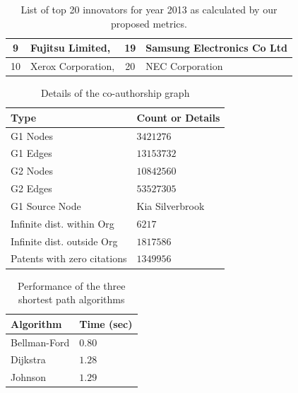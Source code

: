 \begin{table}[t]
\begin{tabular}{clcl}
\multicolumn{1}{|c|}{9}             & \multicolumn{1}{l|}{Fujitsu Limited,}                            & \multicolumn{1}{c|}{19}            & \multicolumn{1}{l|}{Samsung Electronics Co Ltd}                \\ \hline
\multicolumn{1}{|c|}{10}            & \multicolumn{1}{l|}{Xerox Corporation,}                          & \multicolumn{1}{c|}{20}            & \multicolumn{1}{l|}{NEC Corporation}                           \\ \hline                                                               
\end{tabular}
\caption{List of top 20 innovators for year 2013 as calculated by our proposed metrics.}
\label{lst:top20}
\end{table}


\begin{table}[t]
\centering

		\begin{tabular}{| l | l |}
		\hline
		
		{Type} & {Count or Details} \\
		\hline
		\hline
		G1 Nodes & $3421276$ \\
		G1 Edges & $13153732$ \\
		G2 Nodes & $10842560$ \\
		G2 Edges & $53527305$ \\
		G1 Source Node & Kia Silverbrook \\
		Infinite dist. within Org & $6217$\\
		Infinite dist. outside Org& $1817586$ \\
		Patents with zero citations & $1349956$ \\
		\hline
	\end{tabular}		
	\caption { Details of the co-authorship graph}
	\label{tab:model}
\end{table}	

\begin{table}[t]
\centering

	\begin{tabular}{| l | l |}
		\hline
		{Algorithm} & {Time (sec)} \\
		\hline
		\hline
		Bellman-Ford & $0.80$ \\
		Dijkstra & $1.28$ \\
		Johnson & $1.29$ \\
		\hline
	\end{tabular}
	\caption { Performance of the three shortest path algorithms}
	\label{tab:algos}
\end{table}					


